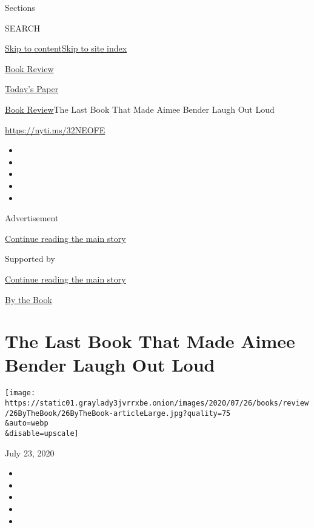 Sections

SEARCH

\protect\hyperlink{site-content}{Skip to
content}\protect\hyperlink{site-index}{Skip to site index}

\href{https://www.nytimes3xbfgragh.onion/section/books/review}{Book
Review}

\href{https://myaccount.nytimes3xbfgragh.onion/auth/login?response_type=cookie\&client_id=vi}{}

\href{https://www.nytimes3xbfgragh.onion/section/todayspaper}{Today's
Paper}

\href{/section/books/review}{Book Review}\textbar{}The Last Book That
Made Aimee Bender Laugh Out Loud

\url{https://nyti.ms/32NEOFE}

\begin{itemize}
\item
\item
\item
\item
\item
\end{itemize}

Advertisement

\protect\hyperlink{after-top}{Continue reading the main story}

Supported by

\protect\hyperlink{after-sponsor}{Continue reading the main story}

\href{/column/by-the-book}{By the Book}

\hypertarget{the-last-book-that-made-aimee-bender-laugh-out-loud}{%
\section{The Last Book That Made Aimee Bender Laugh Out
Loud}\label{the-last-book-that-made-aimee-bender-laugh-out-loud}}

\texttt{[image: https://static01.graylady3jvrrxbe.onion/images/2020/07/26/books/review/26ByTheBook/26ByTheBook-articleLarge.jpg?quality=75\\\&auto=webp\\\&disable=upscale]}

July 23, 2020

\begin{itemize}
\item
\item
\item
\item
\item
\end{itemize}

